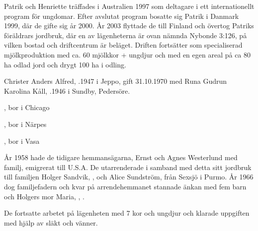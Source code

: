 Patrik och Henriette träffades i Australien 1997 som deltagare i ett internationellt program för ungdomar. Efter avslutat program bosatte sig Patrik i Danmark 1999, där de gifte sig år 2000. År 2003 flyttade de till Finland och övertog Patriks föräldrars jordbruk, där en av  lägenheterna är ovan nämnda Nybonde 3:126, på vilken bostad och driftcentrum är beläget. Driften fortsätter som specialiserad mjölkproduktion med ca. 60 mjölkkor + ungdjur och med en egen areal på ca 80 ha odlad jord och drygt 100 ha i odling.



Christer Anders Alfred, .1947 i Jeppo, gift 31.10.1970 med Runa Gudrun Karolina Kåll, .1946 i Sundby, Pedersöre.
\begin{jhchildren}
  \item {}
  \item {}, bor i Chicago
  \item {}, bor i Närpes
  \item {}, bor i Vasa
\end{jhchildren}

År 1958 hade de tidigare hemmansägarna, Ernst och Agnes Westerlund med familj, emigrerat till U.S.A. De utarrenderade i samband med detta sitt jordbruk till familjen Holger Sandvik, , och Alice Sundström,  från Sexsjö i Purmo. År 1966 dog familjefadern och kvar på arrendehemmanet stannade änkan med fem barn och Holgers mor Maria, , .
\begin{jhchildren}
  \item {}
  \item {}
  \item {}
  \item {}
  \item {}
\end{jhchildren}
De fortsatte arbetet på lägenheten med 7 kor och ungdjur och klarade uppgiften med hjälp av släkt och vänner.

